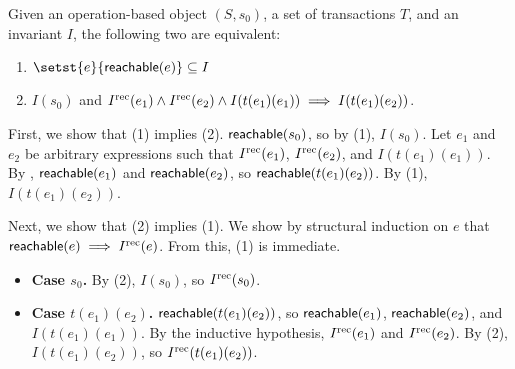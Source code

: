 \begin{claim}
  Given an operation-based object $(S, s_0)$, a set of transactions $T$, and an
  invariant $I$, the following two are equivalent:
  \begin{enumerate}[\quad(1)]
    \item
      $\setst{e}{\reachable{e}} \subseteq I$

    \item
      $I(s_0)$ and $I^{\text{rec}}(e_1) \land I^{\text{rec}}(e_2) \land I(t(e_1)(e_1)) \implies
      I(t(e_1)(e_2))$.
  \end{enumerate}
\end{claim}
\begin{elidableproof}
  First, we show that (1) implies (2). $\textsf{reachable}(s_0)$, so by (1), $I(s_0)$.
  Let $e_1$ and $e_2$ be arbitrary expressions such that $I^{\text{rec}}(e_1)$,
  $I^{\text{rec}}(e_2)$, and $I(t(e_1)(e_1))$. By ,
  $\textsf{reachable}(e_1)$ and $\textsf{reachable}(e_2)$, so $\textsf{reachable}(t(e_1)(e_2))$. By
  (1), $I(t(e_1)(e_2))$.

  Next, we show that (2) implies (1). We show by structural induction on $e$
  that $\textsf{reachable}(e) \implies I^{\text{rec}}(e)$. From this, (1) is immediate.
  \begin{itemize}
    \item \textbf{Case $s_0$.}
      By (2), $I(s_0)$, so $I^{\text{rec}}(s_0)$.

    \item \textbf{Case $t(e_1)(e_2)$.}
      $\textsf{reachable}(t(e_1)(e_2))$, so $\textsf{reachable}(e_1)$, $\textsf{reachable}(e_2)$, and
      $I(t(e_1)(e_1))$. By the inductive hypothesis, $I^{\text{rec}}(e_1)$ and
      $I^{\text{rec}}(e_2)$. By (2), $I(t(e_1)(e_2))$, so $I^{\text{rec}}(t(e_1)(e_2))$.
  \end{itemize}
\end{elidableproof}
